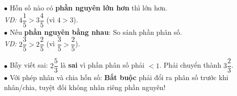 \documentclass[14pt,a4paper,oneside]{extbook}
\begin{document}
\noindent
\begin{minipage}[t]{0.54\textwidth}
  \begin{tcolorbox}[
    enhanced,
    title={\footnotesize\bfseries\color{white}\faBalanceScale\ So sánh hai hỗn số},
    colback=green!3!white,
    colframe=green!60!black,
    arc=2.5mm, boxrule=0.8pt, top=1.8mm, bottom=1.8mm, left=2.2mm, right=2.2mm
  ]
    \footnotesize
    $\bullet$ Hỗn số nào có \textbf{phần nguyên lớn hơn} thì lớn hơn.\\
    \textit{VD:} $4\dfrac{1}{5} > 3\dfrac{4}{5}$ (vì $4 > 3$).\\
    $\bullet$ Nếu \textbf{phần nguyên bằng nhau}: So sánh phần phân số.\\
    \textit{VD:} $2\dfrac{3}{5} > 2\dfrac{2}{5}$ (vì $\dfrac{3}{5} > \dfrac{2}{5}$).
  \end{tcolorbox}
\end{minipage}%
\hfill
\begin{minipage}[t]{0.44\textwidth}
  \begin{tcolorbox}[
    enhanced,
    title={\footnotesize\bfseries\color{white}\faExclamationTriangle\ Mẹo tránh bẫy trắc nghiệm},
    colback=red!2!white,
    colframe=red!70!black,
    arc=2.5mm, boxrule=0.8pt, top=1.8mm, bottom=1.8mm, left=2.2mm, right=2.2mm
  ]
    \footnotesize
    $\bullet$ Bẫy viết sai: $2\dfrac{5}{3}$ là \textbf{sai} vì phần phân số phải $< 1$. Phải chuyển thành $3\dfrac{2}{3}$.\\
    $\bullet$ Với phép nhân và chia hỗn số: \textbf{Bắt buộc} phải đổi ra phân số trước khi nhân/chia, tuyệt đối không nhân riêng phần nguyên!
  \end{tcolorbox}
\end{minipage}
\end{document}
